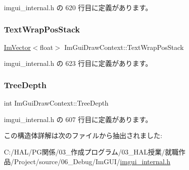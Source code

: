  imgui\+\_\+internal.\+h の 620 行目に定義があります。

\mbox{\label{struct_im_gui_draw_context_ac282b2f910a8846f4c200c358974b12a}} 
\subsubsection{\texorpdfstring{Text\+Wrap\+Pos\+Stack}{TextWrapPosStack}}
{\footnotesize\ttfamily \mbox{\hyperlink{class_im_vector}{Im\+Vector}}$<$float$>$ Im\+Gui\+Draw\+Context\+::\+Text\+Wrap\+Pos\+Stack}



 imgui\+\_\+internal.\+h の 623 行目に定義があります。

\mbox{\label{struct_im_gui_draw_context_a08d8578fe382425a67b4f5e5257b5436}} 
\subsubsection{\texorpdfstring{Tree\+Depth}{TreeDepth}}
{\footnotesize\ttfamily int Im\+Gui\+Draw\+Context\+::\+Tree\+Depth}



 imgui\+\_\+internal.\+h の 607 行目に定義があります。



この構造体詳解は次のファイルから抽出されました\+:\begin{DoxyCompactItemize}
\item 
C\+:/\+H\+A\+L/\+P\+G関係/03\+\_\+作成プログラム/03\+\_\+\+H\+A\+L授業/就職作品/\+Project/source/06\+\_\+\+Debug/\+Im\+G\+U\+I/\mbox{\hyperlink{imgui__internal_8h}{imgui\+\_\+internal.\+h}}\end{DoxyCompactItemize}
